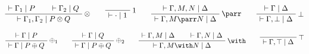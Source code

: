 \(\AxRule{\vdash\Gamma_1\mid P}
\AxRule{\vdash\Gamma_2\mid Q}
\LabelRule{\tens}
\BinRule{\vdash\Gamma_1,\Gamma_2\mid P\otimes Q}
\DisplayProof
\qquad
\LabelRule{\one}
\NulRule{\vdash\cdot\mid\one}
\DisplayProof
\qquad
\AxRule{\vdash\Gamma, M, N\mid \Delta}
\LabelRule{\parr}
\UnaRule{\vdash\Gamma, M\parr N\mid \Delta}
\DisplayProof
\qquad
\AxRule{\vdash\Gamma\mid \Delta}
\LabelRule{\bot}
\UnaRule{\vdash\Gamma, \bot\mid\Delta}
\DisplayProof\)

\(\AxRule{\vdash\Gamma\mid P}
\LabelRule{\plus_1}
\UnaRule{\vdash\Gamma\mid P\plus Q}
\DisplayProof
\qquad
\AxRule{\vdash\Gamma\mid Q}
\LabelRule{\plus_2}
\UnaRule{\vdash\Gamma\mid P\plus Q}
\DisplayProof
\qquad
\AxRule{\vdash\Gamma,M\mid \Delta}
\AxRule{\vdash\Gamma,N\mid \Delta}
\LabelRule{\with}
\BinRule{\vdash\Gamma,M\with N\mid \Delta}
\DisplayProof
\qquad
\LabelRule{\top}
\NulRule{\vdash\Gamma,\top\mid \Delta}
\DisplayProof\)

